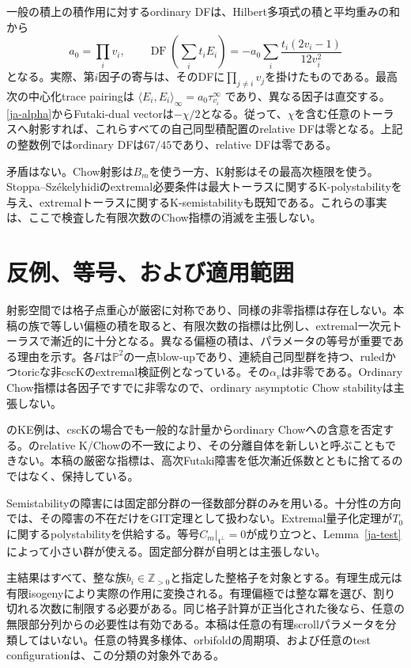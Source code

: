 \documentclass[12pt]{amsart}
\theoremstyle{definition}
\theoremstyle{remark}
\numberwithin{equation}{section}
\newcommand{\Z}{\mathbb{Z}}
\newcommand{\mP}{\mathbb{P}}
\DeclareMathOperator{\DF}{DF}
\begin{document}
一般の積上の積作用に対するordinary DFは、Hilbert多項式の積と平均重みの和から
\begin{equation}\label{ja-productDF}
 a_0=\prod_i v_i,\qquad
 \DF\left(\sum_it_iE_i\right)
 =-a_0\sum_i\frac{t_i(2v_i-1)}{12v_i^2}
\end{equation}
となる。実際、第$i$因子の寄与は、そのDFに$\prod_{j\ne i}v_j$を掛けたものである。最高次の中心化trace pairingは
$\langle E_i,E_i\rangle_\infty=a_0\tau_{v_i}^\infty$
であり、異なる因子は直交する。\eqref{ja-alpha}からFutaki-dual vectorは$-\chi/2$となる。従って、$\chi$を含む任意のトーラスへ射影すれば、これらすべての自己同型積配置のrelative DFは零となる。上記の整数例ではordinary DFは$67/45$であり、relative DFは零である。

矛盾はない。Chow射影は$B_m$を使う一方、K射影はその最高次極限を使う。Stoppa--Székelyhidiのextremal必要条件は最大トーラスに関するK-polystabilityを与え\cite[Theorem 4]{ja-SS}、extremalトーラスに関するK-semistabilityも既知である\cite[Theorem 1.3]{ja-Has17}。これらの事実は、ここで検査した有限次数のChow指標の消滅を主張しない。

\section{反例、等号、および適用範囲}

射影空間では格子点重心が厳密に対称であり、同様の非零指標は存在しない。本稿の族で等しい偏極の積を取ると、有限次数の指標は比例し、extremal一次元トーラスで漸近的に十分となる。異なる偏極の積は、パラメータの等号が重要である理由を示す。各$F$は$\mP^2$の一点blow-upであり、連続自己同型群を持つ、ruledかつtoricな非cscKのextremal検証例となっている。その$\alpha_v$は非零である。Ordinary Chow指標は各因子ですでに非零なので、ordinary asymptotic Chow stabilityは主張しない。

\cite{ja-OSY}のKE例は、cscKの場合でも一般的な計量からordinary Chowへの含意を否定する。\cite{ja-YZ}のrelative K/Chowの不一致により、その分離自体を新しいと呼ぶこともできない。本稿の厳密な指標は、高次Futaki障害を低次漸近係数とともに捨てるのではなく、保持している。

Semistabilityの障害には固定部分群の一径数部分群のみを用いる。十分性の方向では、その障害の不在だけをGIT定理として扱わない。Extremal量子化定理が$T_0$に関するpolystabilityを供給する。等号$C_m|_{\mathfrak t^\perp}=0$が成り立つと、Lemma~\ref{ja-test}によって小さい群が使える。固定部分群が自明とは主張しない。

主結果はすべて、整な族$b_i\in\Z_{>0}$と指定した整格子を対象とする。有理生成元は有限isogenyにより実際の作用に変換される。有理偏極では整な冪を選び、割り切れる次数に制限する必要がある。同じ格子計算が正当化された後なら、任意の無限部分列からの必要性は有効である。本稿は任意の有理scrollパラメータを分類してはいない。任意の特異多様体、orbifoldの周期項、および任意のtest configurationは、この分類の対象外である。
\end{document}

